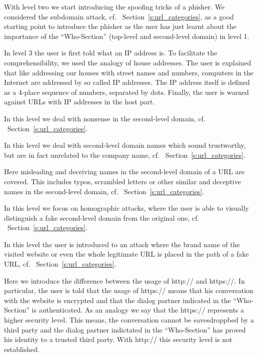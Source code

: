 \begin{description}[leftmargin=0cm]
	\item[Level 2] With level two we start introducing the spoofing tricks of a phisher.
 We considered the subdomain attack, cf.
~Section~\ref{s:url_categories}, as a good starting point to introduce the phisher as the user has just learnt about the importance of the ``Who-Section'' (top-level and second-level domain) in level 1.
	\item[Level 3] In level 3 the user is first told what an IP address is.
 To facilitate the comprehensibility, we used the analogy of house addresses.
 The user is explained that like addressing our houses with street names and numbers, computers in the Internet are addressed by so called IP addresses.
 The IP address itself is defined as a 4-place sequence of numbers, separated by dots.
 Finally, the user is warned against URLs with IP addresses in the host part.

	\item[Level 4] In this level we deal with nonsense in the second-level domain, cf.
~Section~\ref{s:url_categories}.
	\item[Level 5] In this level we deal with second-level domain names which sound trustworthy, but are in fact unrelated to the company name, cf.
~Section~\ref{s:url_categories}.
	\item[Level 6] Here misleading and deceiving names in the second-level domain of a URL are covered.
 This includes typos, scrambled letters or other similar and deceptive names in the second-level domain, cf.
~Section~\ref{s:url_categories}.
	\item[Level 7] In this level we focus on homographic attacks, where the user is able to visually distinguish a fake second-level domain from the original one, cf.
~Section~\ref{s:url_categories}.
	\item[Level 8] In this level the user is introduced to an attack where the brand name of the visited website or even the whole legitimate URL is placed in the path of a fake URL, cf.
~Section~\ref{s:url_categories}.
	\item[Level 9] Here we introduce the difference between the usage of http:// and https://. In particular, the user is told that the usage of https:// means that his conversation with the website is encrypted and that the dialog partner indicated in the ``Who-Section'' is authenticated.
 As an analogy we say that the https:// represents a higher security level.
 This means, the conversation cannot be eavesdroppbed by a third party and the dialog partner indictated in the ``Who-Section'' has proved his identity to a trusted third party.
 With http:// this security level is not established.


\end{description}
